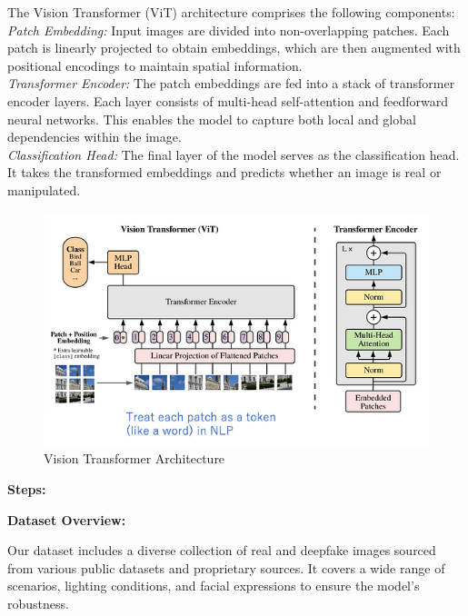 \noindent The Vision Transformer (ViT) architecture comprises the following components:
\\

\noindent \textit{Patch Embedding:} Input images are divided into non-overlapping patches. Each patch is linearly projected to obtain embeddings, which are then augmented with positional encodings to maintain spatial information.
\\

\noindent \textit{Transformer Encoder:} The patch embeddings are fed into a stack of transformer encoder layers. Each layer consists of multi-head self-attention and feedforward neural networks. This enables the model to capture both local and global dependencies within the image.
\\

\noindent \textit{Classification Head:} The final layer of the model serves as the classification head. It takes the transformed embeddings and predicts whether an image is real or manipulated.
\\

\begin{figure}[h]
    \centering
    \includegraphics[width=6in]{img/visiontransformer.png}
    \caption{Vision Transformer Architecture}
\end{figure}

\newpage
\noindent \textbf{Steps:}
\vspace{0.2cm}

\noindent \textbf{Dataset Overview:}

\noindent Our dataset includes a diverse collection of real and deepfake images sourced from various public datasets and proprietary sources. It covers a wide range of scenarios, lighting conditions, and facial expressions to ensure the model's robustness.
\\

